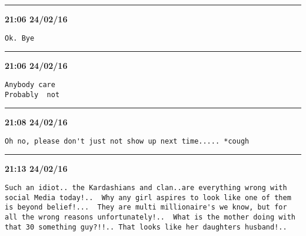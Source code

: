 \hrule%

\begin{adjustwidth}{0cm}{0cm}
\footnotesize \textbf{21:06 24/02/16}

\begin{lstlisting}[breaklines, breakatwhitespace, basicstyle=\small, frame=leftline]
Ok. Bye
\end{lstlisting}
\end{adjustwidth}

\hrule%

\begin{adjustwidth}{0cm}{0cm}
\footnotesize \textbf{21:06 24/02/16}

\begin{lstlisting}[breaklines, breakatwhitespace, basicstyle=\small, frame=leftline]
Anybody care 
Probably  not
\end{lstlisting}
\end{adjustwidth}

\hrule%

\begin{adjustwidth}{0cm}{0cm}
\footnotesize \textbf{21:08 24/02/16}

\begin{lstlisting}[breaklines, breakatwhitespace, basicstyle=\small, frame=leftline]
Oh no, please don't just not show up next time..... *cough
\end{lstlisting}
\end{adjustwidth}

\hrule%

\begin{adjustwidth}{0cm}{0cm}
\footnotesize \textbf{21:13 24/02/16}

\begin{lstlisting}[breaklines, breakatwhitespace, basicstyle=\small, frame=leftline]
Such an idiot.. the Kardashians and clan..are everything wrong with social Media today!..  Why any girl aspires to look like one of them is beyond belief!...  They are multi millionaire's we know, but for all the wrong reasons unfortunately!..  What is the mother doing with that 30 something guy?!!.. That looks like her daughters husband!..
\end{lstlisting}
\end{adjustwidth}

